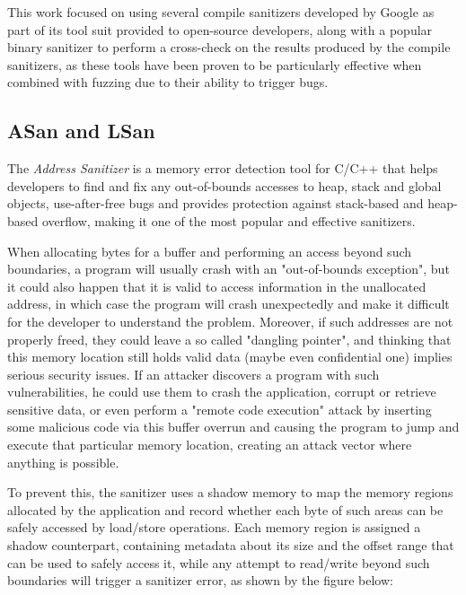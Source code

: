 This work focused on using several compile sanitizers developed by Google \cite{san_repo} as part of its tool suit provided to open-source developers, along with a popular binary sanitizer \cite{valgrind_web} to perform a cross-check on the results produced by the compile sanitizers, as these tools have been proven to be particularly effective when combined with fuzzing due to their ability to trigger bugs.




\newpage
\subsection{ASan and LSan}
The \textit{Address Sanitizer} \cite{serebryany2012addresssanitizer} is a memory error detection tool for C/C++ that helps developers to find and fix any out-of-bounds accesses to heap, stack and global objects, use-after-free bugs and provides protection against stack-based and heap-based overflow, making it one of the most popular and effective sanitizers.

When allocating bytes for a buffer and performing an access beyond such boundaries, a program will usually crash with an "out-of-bounds exception", but it could also happen that it is valid to access information in the unallocated address, in which case the program will crash unexpectedly and make it difficult for the developer to understand the problem. Moreover, if such addresses are not properly freed, they could leave a so called "dangling pointer", and thinking that this memory location still holds valid data (maybe even confidential one) implies serious security issues.
If an attacker discovers a program with such vulnerabilities, he could use them to crash the application, corrupt or retrieve sensitive data, or even perform a "remote code execution" attack by inserting some malicious code via this buffer overrun and causing the program to jump and execute that particular memory location, creating an attack vector where anything is possible. 

To prevent this, the sanitizer uses a shadow memory to map the memory regions allocated by the application and record whether each byte of such areas can be safely accessed by load/store operations. Each memory region is assigned a shadow counterpart, containing metadata about its size and the offset range that can be used to safely access it, while any attempt to read/write beyond such boundaries will trigger a sanitizer error, as shown by the figure below:

